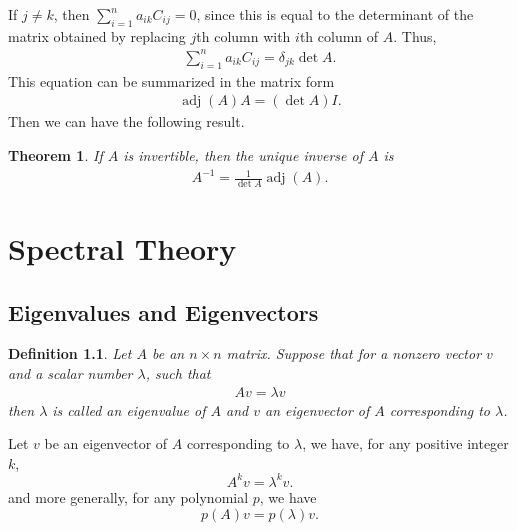\documentclass[11pt]{book}
\newtheorem{definition}{Definition}[section]
\newtheorem{theorem}{Theorem}[section]
\theoremstyle{definition}
\numberwithin{equation}{chapter}
\begin{document}
\medskip

If $j \neq k$, then $\sum^n_{i=1} a_{ik} C_{ij} = 0$, since this is equal to the determinant of the matrix obtained by replacing $j$th column with $i$th column of $A$. Thus,
\begin{align*}
    \sum^n_{i=1} a_{ik} C_{ij} = \delta_{jk} \det A.
\end{align*}
This equation can be summarized in the matrix form
\begin{align*}
    \operatorname{adj}(A) A = (\det A) I.
\end{align*}
Then we can have the following result.

\medskip

\begin{theorem}
If $A$ is invertible, then the unique inverse of $A$ is
\begin{align*}
    A^{-1} = \frac{1}{\det A} \operatorname{adj}(A).
\end{align*}
\end{theorem}













\medskip

\chapter{Spectral Theory}

\section{Eigenvalues and Eigenvectors}

\begin{definition}
Let $A$ be an $n\times n$ matrix. Suppose that for a nonzero vector $v$ and a scalar number $\lambda$, such that 
\begin{align*}
    Av = \lambda v
\end{align*}
then $\lambda$ is called an eigenvalue of $A$ and $v$ an eigenvector of $A$ corresponding to $\lambda$.
\end{definition}

Let $v$ be an eigenvector of $A$ corresponding to $\lambda$, we have, for any positive integer $k$, 
$$A^k v = \lambda^k v.$$
and more generally, for any polynomial $p$, we have 
$$p(A)v = p(\lambda)v.$$
\end{document}
